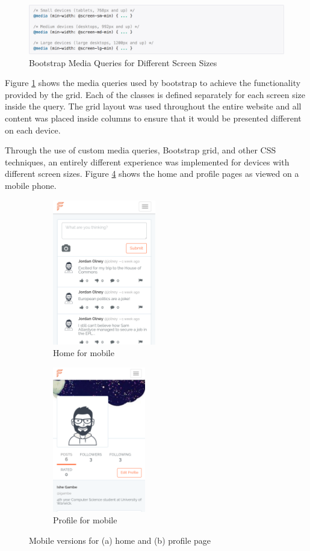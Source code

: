 \begin{figure}[H]
\centering
\includegraphics[width=1.0\textwidth]{Images/Implementation/MediaQueries}
\caption{Bootstrap Media Queries for Different Screen Sizes} \label{fig:MediaQueries}
\end{figure}

Figure \ref{fig:MediaQueries} shows the media queries used by bootstrap to achieve the functionality provided by the grid. Each of the classes is defined separately for each screen size inside the query. The grid layout was used throughout the entire website and all content was placed inside columns to ensure that it would be presented different on each device.

Through the use of custom media queries, Bootstrap grid, and other CSS techniques, an entirely different experience was implemented for devices with different screen sizes. Figure \ref{fig:MobileView} shows the home and profile pages as viewed on a mobile phone.

\begin{figure}[H]
	\centering
	\begin{subfigure}[t]{0.45\textwidth}
		\centering
		\includegraphics[height=2.5in]{Images/Implementation/MobileHome}
		\caption{Home for mobile}\label{fig:MobileHome}		
	\end{subfigure}
	\quad
	\begin{subfigure}[t]{0.45\textwidth}
		\centering
		\includegraphics[height=2.5in]{Images/Implementation/MobileProfile}
		\caption{Profile for mobile}\label{fig:MobileProfile}
	\end{subfigure}
	\caption{Mobile versions for (a) home and (b) profile page}\label{fig:MobileView}
\end{figure}